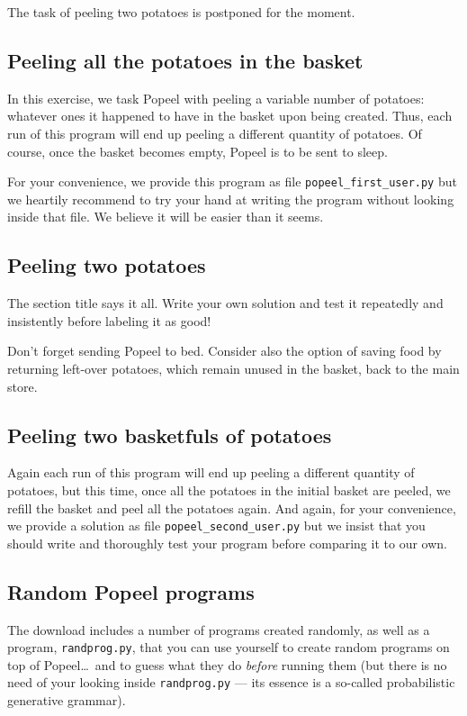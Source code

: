 \documentclass[12pt]{article}
\begin{document}
The task of peeling two potatoes is postponed for the moment.

\subsection{Peeling all the potatoes in the basket}

In this exercise, we task Popeel with peeling a
variable number of potatoes: whatever ones it 
happened to have in the basket upon being created.
Thus, each run of this program will end up peeling a 
different quantity of potatoes. Of course, once the
basket becomes empty, Popeel is to be sent to sleep.

For your convenience, we provide this program as file 
{\tt popeel_first_user.py} but we heartily recommend to
try your hand at writing the program without looking
inside that file. We believe it will be easier than
it seems.

\subsection{Peeling two potatoes}

The section title says it all. 
Write your own solution and test it
repeatedly and insistently before labeling it
as good! 

Don't forget sending Popeel to bed.
Consider also the option of saving food by
returning left-over potatoes, which remain
unused in the basket, back to the main store.

\subsection{Peeling two basketfuls of potatoes}

Again each run of this program will end up peeling a 
different quantity of potatoes, but this time, once
all the potatoes in the initial basket are peeled,
we refill the basket and peel all the potatoes again.
And again, for your convenience, we provide a solution 
as file {\tt popeel_second_user.py} but we insist that you
should write and thoroughly test your program before 
comparing it to our own.

\subsection{Random Popeel programs}

The download includes a number of programs created
randomly, as well as a program, {\tt randprog.py}, that
you can use yourself to create random programs on 
top of Popeel\dots\ and to guess what they do \emph{before}
running them (but there is no need of your looking 
inside {\tt randprog.py} --- its essence is a so-called
probabilistic generative grammar).
\end{document}
